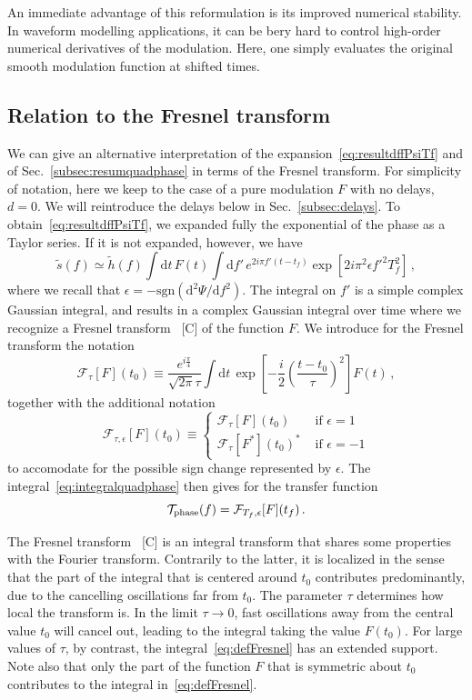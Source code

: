 \documentclass[aps,showpacs,twocolumn,
prd,superscriptaddress,nofootinbib]{revtex4-1}
\newcommand{\be}{\begin{equation}}
\newcommand{\ee}{\end{equation}}
\newcommand\ud{{\mathrm{d}}}
\newcommand\calF{{\mathcal{F}}}
\newcommand\calT{{\mathcal{T}}}
\newcommand{\tf}{t_{f}}
\newcommand{\Tf}{T_{f}}
\newcommand{\SM}[1]{{\color{Red} #1}}
\begin{document}
An immediate advantage of this reformulation is its improved numerical stability. In waveform modelling applications, it can be bery hard to control high-order numerical derivatives of the modulation. Here, one simply evaluates the original smooth modulation function at shifted times.


\subsection{Relation to the Fresnel transform}
\label{subsec:fresneltransform}

We can give an alternative interpretation of the expansion~\eqref{eq:resultdffPsiTf} and of Sec.~\ref{subsec:resumquadphase} in terms of the Fresnel transform. For simplicity of notation, here we keep to the case of a pure modulation $F$ with no delays, $d=0$. We will reintroduce the delays below in Sec.~\ref{subsec:delays}. To obtain~\eqref{eq:resultdffPsiTf}, we expanded fully the exponential of the phase as a Taylor series. If it is not expanded, however, we have
\be\label{eq:integralquadphase}
	\tilde{s}(f)	\simeq \tilde{h}(f) \int \ud t\, F(t) \int\ud f'\, e^{2i\pi f' (t-\tf)} \exp\left[ 2i\pi^{2} \epsilon{f'}^{2} \Tf^{2} \right] \,,
\ee
where we recall that $\epsilon = -\mathrm{sgn}(\ud ^{2} \Psi/\ud f^{2})$. The integral on $f'$ is a simple complex Gaussian integral, and results in a complex Gaussian integral over time where we recognize a Fresnel transform~\cite{} \SM{[C]} of the function $F$. We introduce for the Fresnel transform the notation
\be\label{eq:defFresnel}
	\calF_{\tau}[F](t_{0}) \equiv \frac{e^{i\frac{\pi}{4}}}{\sqrt{2\pi} \tau} \int \ud t \, \exp\left[ - \frac{i}{2} \left( \frac{t-t_{0}}{\tau} \right)^{2}\right] F(t) \,,
\ee
together with the additional notation
\be\label{eq:Fresnelsign}
	\calF_{\tau, \epsilon}[F](t_{0}) \equiv
\begin{cases}
	 \calF_{\tau}[F](t_{0}) &\text{ if } \epsilon=1 \\
	 \calF_{\tau}[F^{*}](t_{0})^{*} &\text{ if } \epsilon=-1
\end{cases}
\ee
to accomodate for the possible sign change represented by $\epsilon$. The integral~\eqref{eq:integralquadphase} then gives for the transfer function
\be\label{eq:resultFresnel}
	\calT_{\rm phase}(f) = \calF_{\Tf, \epsilon}[F](\tf) \,.
\ee

The Fresnel transform~\cite{} \SM{[C]} is an integral transform that shares some properties with the Fourier transform. Contrarily to the latter, it is localized in the sense that the part of the integral that is centered around $t_{0}$ contributes predominantly, due to the cancelling oscillations far from $t_{0}$.  The parameter $\tau$ determines how local the transform is. In the limit $\tau\rightarrow 0$, fast oscillations away from the central value $t_{0}$ will cancel out, leading to the integral taking the value $F(t_{0})$. For large values of $\tau$, by contrast, the integral~\eqref{eq:defFresnel} has an extended support. Note also that only the part of the function $F$ that is symmetric about $t_{0}$ contributes to the integral in~\eqref{eq:defFresnel}.
\end{document}
